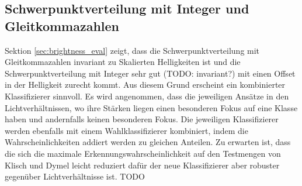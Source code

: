 \subsection{Schwerpunktverteilung mit Integer und Gleitkommazahlen}
Sektion \ref{sec:brightness_eval} zeigt, dass die Schwerpunktverteilung mit Gleitkommazahlen invariant zu Skalierten Helligkeiten ist und die Schwerpunktverteilung mit Integer sehr gut (TODO: invariant?)
mit einen Offset in der Helligkeit zurecht kommt. Aus diesem Grund erscheint ein kombinierter Klassifizierer sinnvoll. Es wird angenommen, dass die jeweiligen Ansätze in den Lichtverhältnissen, wo ihre
Stärken liegen einen besonderen Fokus auf eine Klasse haben und andernfalls keinen besonderen Fokus.
\newline
\newline
Die jeweiligen Klassifizierer werden ebenfalls mit einem Wahlklassifizierer kombiniert, indem die Wahrscheinlichkeiten addiert werden zu gleichen Anteilen. Zu erwarten ist, dass die sich die maximale
Erkennungswahrscheinlichkeit auf den Testmengen von Klisch und Dymel leicht reduziert dafür der neue Klassifizierer aber robuster gegenüber Lichtverhältnisse ist.
\newline
\newline
TODO
